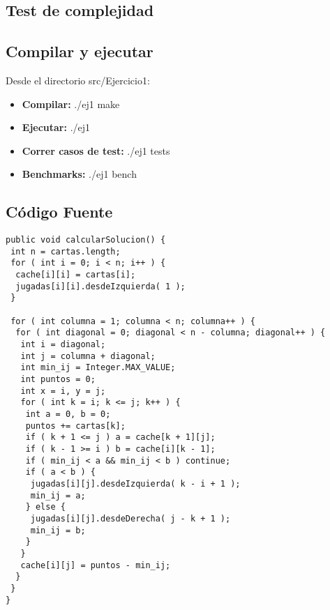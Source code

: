\subsection{Test de complejidad}

\subsection{Compilar y ejecutar}

Desde el directorio src/Ejercicio1:

\begin{itemize}
   \item {\bf Compilar:} ./ej1 make
   \item {\bf Ejecutar:} ./ej1
   \item {\bf Correr casos de test:} ./ej1 tests
   \item {\bf Benchmarks:} ./ej1 bench
\end{itemize}

\subsection{C\'odigo Fuente}
\begin{verbatim}
public void calcularSolucion() {
 int n = cartas.length;
 for ( int i = 0; i < n; i++ ) {
  cache[i][i] = cartas[i];
  jugadas[i][i].desdeIzquierda( 1 );
 }

 for ( int columna = 1; columna < n; columna++ ) {
  for ( int diagonal = 0; diagonal < n - columna; diagonal++ ) {
   int i = diagonal;
   int j = columna + diagonal;
   int min_ij = Integer.MAX_VALUE;
   int puntos = 0;
   int x = i, y = j;
   for ( int k = i; k <= j; k++ ) {
    int a = 0, b = 0;
    puntos += cartas[k];
    if ( k + 1 <= j ) a = cache[k + 1][j];
    if ( k - 1 >= i ) b = cache[i][k - 1];
    if ( min_ij < a && min_ij < b ) continue;
    if ( a < b ) {
     jugadas[i][j].desdeIzquierda( k - i + 1 );
     min_ij = a;
    } else {
     jugadas[i][j].desdeDerecha( j - k + 1 );
     min_ij = b;
    }
   }
   cache[i][j] = puntos - min_ij;
  }
 }
}
\end{verbatim}
